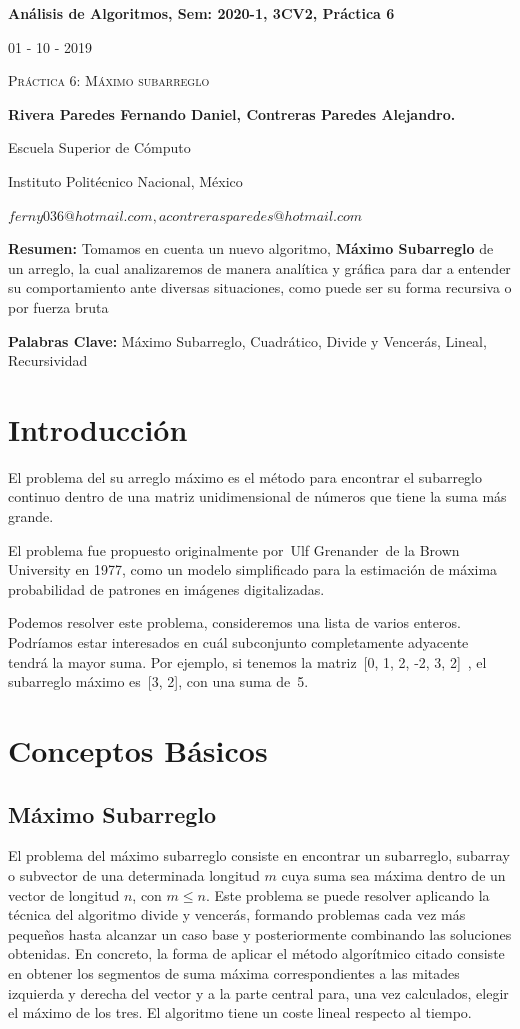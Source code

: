 \documentclass[12pt,twoside]{article}
\begin{document}
\centerline{\bf An\'alisis de Algoritmos, Sem: 2020-1, 3CV2, Pr\'actica 6}
\centerline{}
\centerline{01 - 10 - 2019}
\begin{center}
\Large{\textsc{Pr\'actica 6: Máximo subarreglo}}
\end{center}
\centerline{}
\centerline{\bf {Rivera Paredes Fernando Daniel, Contreras Paredes Alejandro.}}
\centerline{}
\centerline{Escuela Superior de C\'omputo}
\centerline{Instituto Polit\'ecnico Nacional, M\'exico}
\centerline{$ferny036@hotmail.com, acontrerasparedes@hotmail.com$}
\newtheorem{Theorem}{\quad Theorem}[section] \newtheorem{Definition}[Theorem]{\quad Definition} \newtheorem{Corollary}[Theorem]{\quad Corollary} \newtheorem{Lemma}[Theorem]{\quad Lemma} \newtheorem{Example}[Theorem]{\quad Example} \bigskip
\textbf{Resumen:} Tomamos en cuenta un nuevo algoritmo, \textbf{Máximo Subarreglo} de un arreglo, la cual analizaremos de manera analítica y gráfica 
para dar a entender su comportamiento ante diversas situaciones, como puede ser su forma recursiva o por fuerza bruta
\centerline{}
{\bf Palabras Clave:} Máximo Subarreglo, Cuadrático, Divide y Vencerás, Lineal, Recursividad
\newpage

\section{Introducción}
El problema del su arreglo máximo es el método para encontrar el subarreglo continuo dentro de una matriz unidimensional de números que tiene la suma más grande.

El problema fue propuesto originalmente por Ulf Grenander de la Brown University en 1977, como un modelo simplificado para la estimación de máxima probabilidad de patrones en imágenes digitalizadas.

Podemos resolver este problema, consideremos una lista de varios enteros. Podríamos estar interesados ​​en cuál subconjunto completamente adyacente tendrá la mayor suma. Por ejemplo, si tenemos la matriz [0, 1, 2, -2, 3, 2] ,
el subarreglo máximo es [3, 2], con una suma de 5.
\newpage
\section{Conceptos B\'asicos} 
\subsection{\textbf{Máximo Subarreglo}}
\setlength{\parindent}{1.5em}El problema del máximo subarreglo consiste en encontrar un subarreglo, subarray o subvector de una determinada longitud $m$ cuya suma sea máxima dentro de un vector de longitud $n$, con $m \leq n$.
Este problema se puede resolver aplicando la técnica del algoritmo divide y vencerás, formando problemas cada vez más pequeños hasta alcanzar un caso base y posteriormente combinando las soluciones obtenidas. En concreto, la forma de aplicar el 
método algorítmico citado consiste en obtener los segmentos de suma máxima correspondientes a las mitades izquierda y derecha del vector y a la parte central para, una vez calculados, elegir el máximo de los tres. El algoritmo tiene un coste 
lineal respecto al tiempo.
\end{document}
